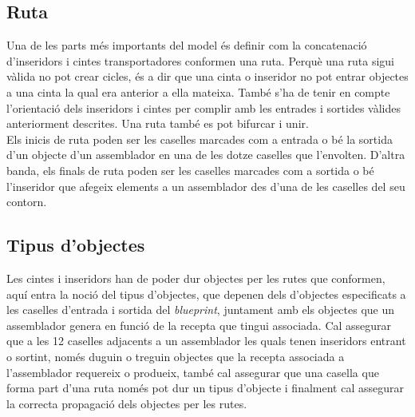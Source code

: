 \subsection{Ruta}
Una de les parts més importants del model és definir com la concatenació d'inseridors i cintes transportadores conformen una ruta. Perquè una ruta sigui vàlida no pot crear cicles, és a dir que una cinta o inseridor no pot entrar objectes a una cinta la qual era anterior a ella mateixa. També s'ha de tenir en compte l'orientació dels inseridors i cintes per complir amb les entrades i sortides vàlides anteriorment descrites. Una ruta també es pot bifurcar i unir.\\
Els inicis de ruta poden ser les caselles marcades com a entrada o bé la sortida d'un objecte d'un assemblador en una de les dotze caselles que l'envolten. D'altra banda, els finals de ruta poden ser les caselles marcades com a sortida o bé l'inseridor que afegeix elements a un assemblador des d'una de les caselles del seu contorn.

\subsection{Tipus d'objectes}
Les cintes i inseridors han de poder dur objectes per les rutes que conformen, aquí entra la noció del tipus d'objectes, que depenen dels d'objectes especificats a les caselles d'entrada i sortida del \textit{blueprint}, juntament amb els objectes que un assemblador genera en funció de la recepta que tingui associada. Cal assegurar que a les 12 caselles adjacents a un assemblador les quals tenen inseridors entrant o sortint, només duguin o treguin objectes que la recepta associada a l'assemblador requereix o produeix, també cal assegurar que una casella que forma part d'una ruta només pot dur un tipus d'objecte i finalment cal assegurar la correcta propagació dels objectes per les rutes.

